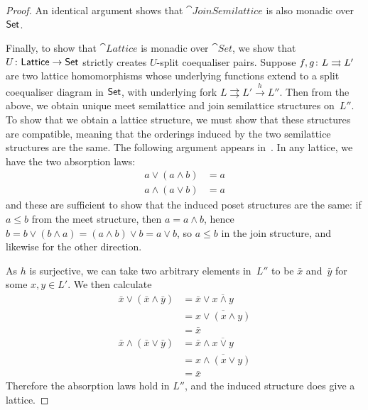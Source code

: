 \documentclass[../../solutions]{subfiles}
\begin{document}
\begin{proof}
  An identical argument shows that $\cat{JoinSemilattice}$ is also
  monadic over $\mathsf{Set}$.

  Finally, to show that $\cat{Lattice}$ is monadic over $\cat{Set}$,
  we show that ${U}\colon{\ensuremath{\mathsf{Lattice}}}\to{\ensuremath{\mathsf{Set}}}$ strictly creates
  $U$-split coequaliser pairs.  Suppose ${f,g}\colon{L}\rightrightarrows{L'}$ are two
  lattice homomorphisms whose underlying functions extend to a split
  coequaliser diagram in $\mathsf{Set}$, with underlying fork
  $L\rightrightarrows L' \xrightarrow{h} L''$.  Then from the above,
  we obtain unique meet semilattice and join semilattice structures
  on~$L''$.  To show that we obtain a lattice structure, we must show
  that these structures are compatible, meaning that the orderings
  induced by the two semilattice structures are the same.  The
  following argument appears in~\cite{pedicchio99}.  In any lattice,
  we have the two absorption laws:
  \begin{align*}
    a\vee (a\wedge b) &= a \\
    a\wedge (a\vee b) &= a
  \end{align*}
  and these are sufficient to show that the induced poset structures
  are the same: if $a\le b$ from the meet structure, then
  $a=a\wedge b$, hence
  $b=b\vee(b\wedge a)= (a\wedge b)\vee b=a\vee b$, so $a\le b$ in the
  join structure, and likewise for the other direction.

  As $h$ is surjective, we can take two arbitrary elements in~$L''$ to
  be $\bar x$ and~$\bar y$ for some $x,y\in L'$.  We then calculate
  \begin{align*}
    \bar x\vee (\bar x\wedge \bar y)
      &= \bar x\vee \overline{x\wedge y} \\
      &= \overline{x\vee (x\wedge y)} \\
      &= \bar x \\
    \bar x\wedge (\bar x\vee \bar y)
      &= \bar x\wedge \overline{x\vee y} \\
      &= \overline{x\wedge (x\vee y)} \\
      &= \bar x
  \end{align*}
  Therefore the absorption laws hold in $L''$, and the induced
  structure does give a lattice.
\end{proof}
\end{document}
